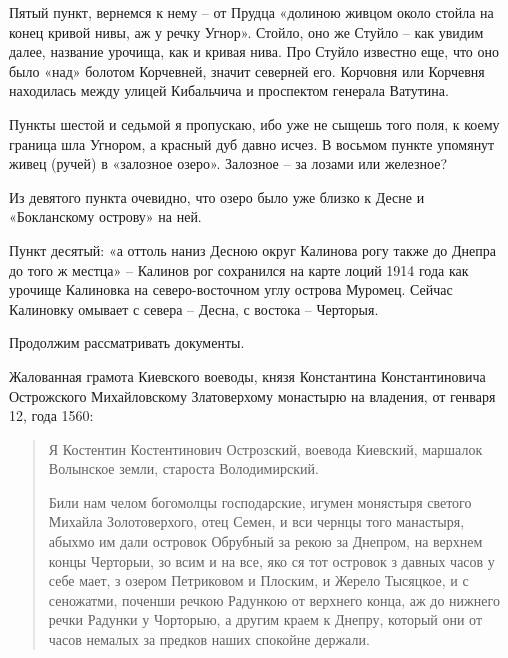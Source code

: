 

Пятый пункт, вернемся к нему – от Прудца «долиною живцом около стойла на конец кривой нивы, аж у речку Угнор». Стойло, оно же Стуйло – как увидим далее, название урочища, как и кривая нива. Про Стуйло известно еще, что оно было «над» болотом Корчевней, значит северней его. Корчовня или Корчевня находилась между улицей Кибальчича и проспектом генерала Ватутина.

Пункты шестой и седьмой я пропускаю, ибо уже не сыщешь того поля, к коему граница шла Угнором, а красный дуб давно исчез. В восьмом пункте упомянут живец (ручей) в «залозное озеро». Залозное – за лозами или железное?

Из девятого пункта очевидно, что озеро было уже близко к Десне и «Бокланскому острову» на ней.

Пункт десятый: «а оттоль наниз Десною округ Калинова рогу также до Днепра до того ж местца» – Калинов рог сохранился на карте лоций 1914 года как урочище Калиновка на северо-восточном углу острова Муромец. Сейчас Калиновку омывает с севера – Десна, с востока – Черторыя.

Продолжим рассматривать документы.

Жалованная грамота Киевского воеводы, князя Константина Константиновича Острожского Михайловскому Златоверхому монастырю на владения, от генваря 12, года 1560:

\begin{quotation}
Я Костентин Костентинович Острозский, воевода Киевский, маршалок Волынское земли, староста Володимирский. 

Били нам челом богомолцы господарские, игумен монястыря светого Михайла Золотоверхого, отец Семен, и вси чернцы того манастыря, абыхмо им дали островок Обрубный за рекою за Днепром, на верхнем концы Черторыи, зо всим и на все, яко ся тот островок з давных часов у себе мает, з озером Петриковом и Плоским, и Жерело Тысяцкое, и с сеножатми, поченши речкою Радункою от верхнего конца, аж до нижнего речки Радунки у Чорторыю, а другим краем к Днепру, который они от часов немалых за предков наших спокойне держали.
\end{quotation}

